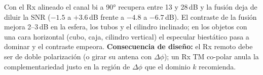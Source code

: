 Con el Rx alineado el canal bi a 90° recupera entre 13 y 28\,dB y la fusión deja de diluir la
SNR ($-1.5$ a $+3.6$\,dB frente a $-4.8$ a $-6.7$\,dB). El contraste de la fusión mejora
2--3\,dB en la esfera, los tubos y el cilindro inclinado; en los objetos con una cara
horizontal (cubo, caja, cilindro vertical) el especular biestático pasa a dominar y el
contraste empeora. \textbf{Consecuencia de diseño:} el Rx remoto debe ser de doble polarización
(o girar su antena con $\Delta\phi$); un Rx TM co-polar anula la complementariedad justo en la
región de $\Delta\phi$ que el dominio $k$ recomienda.

